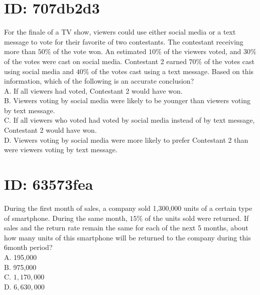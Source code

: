 \section*{ID: 707db2d3}
For the finale of a TV show, viewers could use either social media or a text message to vote for their favorite of two contestants. The contestant receiving more than $50 \%$ of the vote won. An estimated $10 \%$ of the viewers voted, and $30 \%$ of the votes were cast on social media. Contestant 2 earned $70 \%$ of the votes cast using social media and $40 \%$ of the votes cast using a text message. Based on this information, which of the following is an accurate conclusion?\\
A. If all viewers had voted, Contestant 2 would have won.\\
B. Viewers voting by social media were likely to be younger than viewers voting by text message.\\
C. If all viewers who voted had voted by social media instead of by text message, Contestant 2 would have won.\\
D. Viewers voting by social media were more likely to prefer Contestant 2 than were viewers voting by text message.

\section*{ID: 63573fea}
During the first month of sales, a company sold 1,300,000 units of a certain type of smartphone. During the same month, $15 \%$ of the units sold were returned. If sales and the return rate remain the same for each of the next 5 months, about how many units of this smartphone will be returned to the company during this 6month period?\\
A. 195,000\\
B. 975,000\\
C. $1,170,000$\\
D. $6,630,000$

